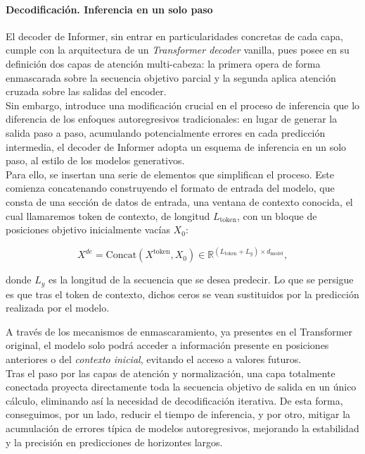 \paragraph{Decodificación. Inferencia en un solo paso}

El decoder de Informer, sin entrar en particularidades concretas de cada capa, cumple con la arquitectura de un \textit{Transformer decoder} vanilla, pues posee en su definición dos capas de atención multi-cabeza: la primera opera de forma enmascarada sobre la secuencia objetivo parcial y la segunda aplica atención cruzada sobre las salidas del encoder.\\

Sin embargo, introduce una modificación crucial en el proceso de inferencia que lo diferencia de los enfoques autoregresivos tradicionales: en lugar de generar la salida paso a paso, acumulando potencialmente errores en cada predicción intermedia, el decoder de Informer adopta un esquema de inferencia en un solo paso, al estilo de los modelos generativos.\\

Para ello, se insertan una serie de elementos que simplifican el proceso. Este comienza concatenando construyendo el formato de entrada del modelo, que consta de una sección de datos de entrada, una ventana de contexto conocida, el cual llamaremos token de contexto, de longitud $L_{\text{token}}$, con un bloque de posiciones objetivo inicialmente vacías $X_0$:

\[
    X^{de} = \text{Concat}(X^{\text{token}}, X_0) \in \mathbb{R}^{(L_{\text{token}} + L_y) \times d_{\text{model}}},
\]

donde $L_y$ es la longitud de la secuencia que se desea predecir. Lo que se persigue es que tras el token de contexto, dichos ceros se vean sustituidos por la predicción realizada por el modelo.

A través de los mecanismos de enmascaramiento, ya presentes en el Transformer original, el modelo solo podrá acceder a información presente en posiciones anteriores o del \textit{contexto inicial}, evitando el acceso a valores futuros.\\

Tras el paso por las capas de atención y normalización, una capa totalmente conectada proyecta directamente toda la secuencia objetivo de salida en un único cálculo, eliminando así la necesidad de decodificación iterativa. De esta forma, conseguimos, por un lado, reducir el tiempo de inferencia, y por otro, mitigar la acumulación de errores típica de modelos autoregresivos, mejorando la estabilidad y la precisión en predicciones de horizontes largos.

